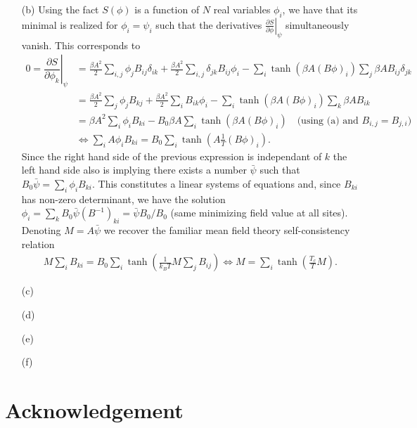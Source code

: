 \documentclass[10pt, a4paper]{article}
\begin{document}
{\begin{enumerate}
  \begin{align*}
    (B^{-1})_{i, j} = \frac{1}{N} \sum_k \frac{1}{B_k} e^{i k \cdot\left(x_i-x_j\right)}  \implies \sum_{i} (B^{-1})_{i, j} = \frac{1}{N}\sum_{k} \frac{1}{B_k} e^{-k \cdot x_j} \left(\sum_i e^{-k \cdot x_i}\right) = \frac{1}{N}\sum_{k} \frac{1}{B_0} e^{-k \cdot x_j} N\delta_{k, 0} = \frac{1}{B_0}
  \end{align*}
  We note that $B_0$ is related to the critical temperature of the gaussian model by $B_0 = k_B T_c$.  
  \item[(b)] Using the fact $S(\phi)$ is a function of $N$ real variables $\phi_i$, we have that its minimal is realized for $\phi_i = \psi_i$ such that the derivatives $\left.\frac{\partial S}{\partial \phi}\right|_{\psi}$ simultaneously vanish. This corresponds to 
  \begin{align*}
    0 = \left.\dfrac{\partial S}{\partial \phi_k}\right|_{\psi} &= \frac{\beta A^2}{2} \sum_{i, j} \phi_j B_{ij} \delta_{ik} + \frac{\beta A^2}{2} \sum_{i, j} \delta_{jk} B_{ij} \phi_i -\sum_i \tanh \left(\beta A(B \phi)_i\right) \sum_j \beta A B_{ij} \delta_{jk}\\
    &=  \frac{\beta A^2}{2} \sum_{j} \phi_j B_{kj} + \frac{\beta A^2}{2} \sum_{i} B_{ik} \phi_i -\sum_i \tanh \left(\beta A(B \phi)_i\right) \sum_k \beta A B_{ik} \\
    &=  \beta A^2 \sum_{i} \phi_i B_{ki}- B_0 \beta A \sum_i \tanh \left(\beta A(B \phi)_i\right)\quad \text{(using (a) and $B_{i, j} = B_{j, i}$)}\\
    &\iff  \sum_{i} A \phi_i B_{ki} = B_0 \sum_i \tanh \left(A\frac{1}{T}(B \phi)_i\right).
  \end{align*}
  Since the right hand side of the previous expression is independant of $k$ the left hand side also is implying there exists a number $\bar{\psi}$ such that $B_0 \bar{\psi} = \sum_{i} \phi_i B_{ki}$. This constitutes a linear systems of equations and, since $B_{ki}$ has non-zero determinant, we have the solution $\phi_i = \sum_{k} B_0 \bar{\psi} (B^{-1})_{ki} = \bar{\psi} B_0/B_0$ (same minimizing field value at all sites). Denoting $M = A \bar{\psi}$ we recover the familiar mean field theory self-consistency relation 
  \begin{align*}
    M \sum_{i} B_{ki} = B_0 \sum_i \tanh \left(\frac{1}{k_B T}M \sum_j B_{ij}\right) \iff M = \sum_i \tanh \left(\frac{T_c}{T}M\right). 
  \end{align*}
  \item[(c)] 
  \item[(d)] 
  \item[(e)]
  \item[(f)]
\end{enumerate}

\section{Acknowledgement}

}

\makereferences


\end{document}
